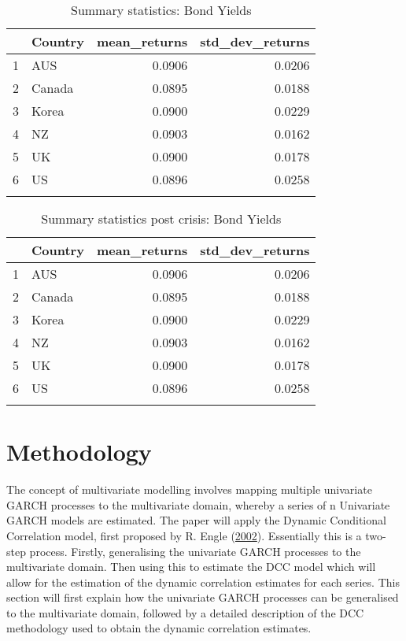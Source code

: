 \documentclass[11pt,preprint, authoryear]{elsarticle}
\numberwithin{equation}{section}
\numberwithin{figure}{section}
\numberwithin{table}{section}
\begin{document}
\begin{longtable}{rlrr}
  \hline
 & Country & mean\_returns & std\_dev\_returns \\ 
  \hline
1 & AUS & 0.0906 & 0.0206 \\ 
  2 & Canada & 0.0895 & 0.0188 \\ 
  3 & Korea & 0.0900 & 0.0229 \\ 
  4 & NZ & 0.0903 & 0.0162 \\ 
  5 & UK & 0.0900 & 0.0178 \\ 
  6 & US & 0.0896 & 0.0258 \\ 
   \hline
\hline
\caption{Summary statistics: Bond Yields \label{tablestats}} 
\end{longtable}

\begin{longtable}{rlrr}
  \hline
 & Country & mean\_returns & std\_dev\_returns \\ 
  \hline
1 & AUS & 0.0906 & 0.0206 \\ 
  2 & Canada & 0.0895 & 0.0188 \\ 
  3 & Korea & 0.0900 & 0.0229 \\ 
  4 & NZ & 0.0903 & 0.0162 \\ 
  5 & UK & 0.0900 & 0.0178 \\ 
  6 & US & 0.0896 & 0.0258 \\ 
   \hline
\hline
\caption{Summary statistics post crisis: Bond Yields \label{tablestats2}} 
\end{longtable}

\section{\texorpdfstring{Methodology
\label{methodology}}{Methodology }}\label{methodology}

The concept of multivariate modelling involves mapping multiple
univariate GARCH processes to the multivariate domain, whereby a series
of n Univariate GARCH models are estimated. The paper will apply the
Dynamic Conditional Correlation model, first proposed by R. Engle
(\protect\hyperlink{ref-engle2002dynamic}{2002}). Essentially this is a
two-step process. Firstly, generalising the univariate GARCH processes
to the multivariate domain. Then using this to estimate the DCC model
which will allow for the estimation of the dynamic correlation estimates
for each series. This section will first explain how the univariate
GARCH processes can be generalised to the multivariate domain, followed
by a detailed description of the DCC methodology used to obtain the
dynamic correlation estimates.
\end{document}

